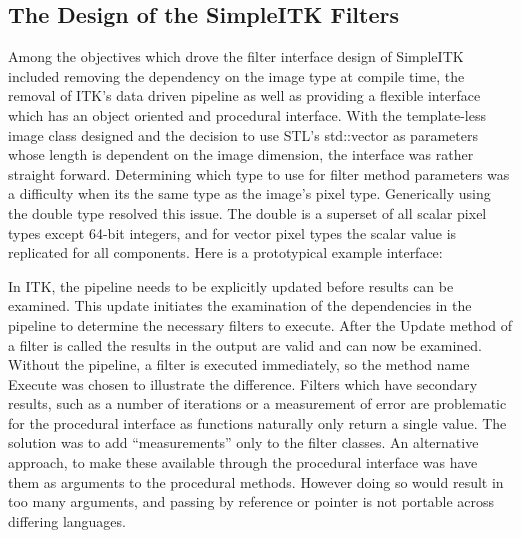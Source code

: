 \documentclass{frontiersMED} %
\begin{document}
\subsection{The Design of the SimpleITK Filters}
Among the objectives which drove the filter interface design of
SimpleITK included removing the dependency on the image type at
compile time, the removal of ITK’s data driven pipeline as well as
providing a flexible interface which has an object oriented and
procedural interface. With the template-less image class designed and
the decision to use STL’s std::vector as parameters whose length is
dependent on the image dimension, the interface was rather straight
forward. Determining which type to use for filter method parameters
was a difficulty when its the same type as the image’s pixel
type. Generically using the double type resolved this issue. The
double is a superset of all scalar pixel types except 64-bit integers,
and for vector pixel types the scalar value is replicated for all
components. Here is a prototypical example interface:




In ITK, the pipeline needs to be explicitly updated before results can
be examined. This update initiates the examination of the dependencies
in the pipeline to determine the necessary filters to execute. After
the Update method of a filter is called the results in the output are
valid and can now be examined. Without the pipeline, a filter is
executed immediately, so the method name Execute was chosen to
illustrate the difference. Filters which have secondary results, such
as a number of iterations or a measurement of error are problematic
for the procedural interface as functions naturally only return a
single value. The solution was to add “measurements” only to the
filter classes. An alternative approach, to make these available
through the procedural interface was  have them as arguments to the
procedural methods. However doing so would result in too many
arguments, and passing by reference or pointer is not portable across
differing languages.
\end{document}

